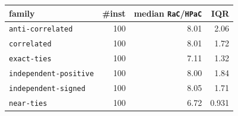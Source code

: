 \begin{tabular}{@{}lrrr@{}}
\toprule
family & \#inst & median \texttt{RaC}/\texttt{HPaC} & IQR \\
\midrule
\texttt{anti-correlated} & 100 & 8.01 & 2.06 \\
\texttt{correlated} & 100 & 8.01 & 1.72 \\
\texttt{exact-ties} & 100 & 7.11 & 1.32 \\
\texttt{independent-positive} & 100 & 8.00 & 1.84 \\
\texttt{independent-signed} & 100 & 8.05 & 1.71 \\
\texttt{near-ties} & 100 & 6.72 & 0.931 \\
\bottomrule
\end{tabular}
